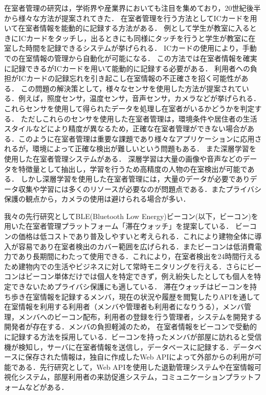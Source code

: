 在室者管理の研究は，学術界や産業界においても注目を集めており，20世紀後半から様々な方法が提案されてきた．
在室者管理を行う方法としてICカードを用いて在室者情報を能動的に記録する方法がある．
例として学生が教室に入るときにICカードをタッチし，出るときにも同様にタッチを行うと学生が教室に在室した時間を記録できるシステムが挙げられる．
ICカードの使用により，手動での在室情報の管理から自動化が可能になる．
この方法では在室者情報を確実に記録できるがICカードを用いて能動的に記録する必要がある．
利用者への負担がICカードの記録忘れを引き起こし在室情報の不正確さを招く可能性がある．
この問題の解決策として，様々なセンサを使用した方法が提案されている．例えば，照度センサ，温度センサ，音声センサ，カメラなどが挙げられる．これらセンサを使用して得られたデータを処理し在室者がいるかどうかを判定する．
ただしこれらのセンサを使用した在室者管理は，環境条件や居住者の生活スタイルなどにより精度が異なるため，正確な在室者管理ができない場合がある．このように在室者管理は重要な課題であり様々なアプリケーションに応用されるが，環境によって正確な検出が難しいという問題もある．
また深層学習を使用した在室者管理システムがある．
深層学習は大量の画像や音声などのデータを特徴量として抽出し，学習を行うため高精度の人物の在室検出が可能である．
しかし深層学習を使用した在室者管理には，大量のデータが必要でありデータ収集や学習には多くのリソースが必要なのが問題点である．またプライバシ保護の観点から，カメラの使用は避けられる場合が多い．

我々の先行研究としてBLE(Bluetooth Low Energy)ビーコン(以下，ビーコン)を用いた在室者管理プラットフォーム「滞在ウォッチ」を提案している．
ビーコンの価格は低コストであり普及しやすいと考えられる．これにより建物全体に導入が容易であり在室者検出のカバー範囲を広げられる．またビーコンは低消費電力であり長期間にわたって使用できる．これにより，在室者検出を24時間行えるため建物内での生活やビジネスに対して常時モニタリングを行える．さらにビーコンはビーコン単体だけでは個人を特定できず，例え紛失したとしても個人を特定できないためプライバシ保護にも適している．
滞在ウォッチはビーコンを持ち歩き在室情報を記録するメンバ，現在の状況や履歴を閲覧したりAPIを通して在室情報を利用する利用者（メンバや管理者も利用者になりうる），メンバ管理，メンバへのビーコン配布，利用者の登録を行う管理者，システムを開発する開発者が存在する．メンバの負担軽減のため，
在室者情報をビーコンで受動的に記録する方法を採用している．ビーコンを持ったメンバが部屋に訪れると受信機が検知し，サーバに在室者情報を送信し，データベースに記録する．データベースに保存された情報は，独自に作成したWeb APIによって外部からの利用が可能である．先行研究として，Web APIを使用した退勤管理システムや在室情報可視化システム，部屋利用者の来訪促進システム，コミュニケーションプラットフォームなどがある．


